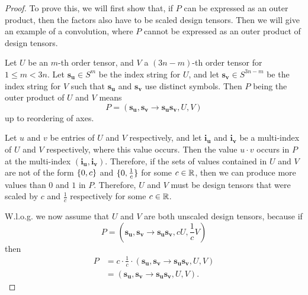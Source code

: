 \bigskip
\begin{proof}
    \small
    To prove this, we will first show that, if $P$ can be expressed as an outer product, then the factors also have to be scaled design tensors.
    Then we will give an example of a convolution, where $P$ cannot be expressed as an outer product of design tensors.

    Let $U$ be an $m$-th order tensor, and $V$ a $(3n-m)$-th order tensor for $1 \leq m < 3n$.
    Let $\bm{s_u} \in S^{m}$ be the index string for $U$,
    and let $\bm{s_v} \in S^{3n - m}$ be the index string for $V$ such that $\bm{s_u}$ and $\bm{s_v}$ use distinct symbols.
    Then $P$ being the outer product of $U$ and $V$ means
    $$P = (\bm{s_u}, \bm{s_v} \rightarrow \bm{s_u}\bm{s_v}, U, V)$$
    up to reordering of axes.

    Let $u$ and $v$ be entries of $U$ and $V$ respectively, and let $\bm{i_u}$ and $\bm{i_v}$ be a multi-index of $U$ and $V$ respectively, where this value occurs.
    Then the value $u \cdot v$ occurs in $P$ at the multi-index $(\bm{i_u}, \bm{i_v})$.
    Therefore, if the sets of values contained in $U$ and $V$ are not of the form $\lbrace 0, c \rbrace$ and $\lbrace 0, \frac{1}{c} \rbrace$ for some $c \in \mathbb{R}$, then we can produce more values than $0$ and $1$ in $P$.
    Therefore, $U$ and $V$ must be design tensors that were scaled by $c$ and $\frac{1}{c}$ respectively for some $c \in \mathbb{R}$.

    W.l.o.g. we now assume that $U$ and $V$ are both unscaled design tensors, because if
    $$P = (\bm{s_u}, \bm{s_v} \rightarrow \bm{s_u}\bm{s_v}, c U, \frac{1}{c} V)$$
    then
    \begin{align*}
        P & = c\cdot \frac{1}{c} \cdot (\bm{s_u}, \bm{s_v} \rightarrow \bm{s_u}\bm{s_v}, U, V) \\
          & = (\bm{s_u}, \bm{s_v} \rightarrow \bm{s_u}\bm{s_v}, U, V).
    \end{align*}


\end{proof}
